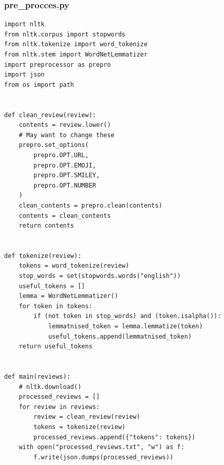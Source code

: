 \documentclass[11pt]{article} %
\begin{document}
\subsubsection{pre\_procces.py}
\begin{verbatim}
import nltk
from nltk.corpus import stopwords
from nltk.tokenize import word_tokenize
from nltk.stem import WordNetLemmatizer
import preprocessor as prepro
import json
from os import path


def clean_review(review):
    contents = review.lower()
    # May want to change these
    prepro.set_options(
        prepro.OPT.URL,
        prepro.OPT.EMOJI,
        prepro.OPT.SMILEY,
        prepro.OPT.NUMBER
    )
    clean_contents = prepro.clean(contents)
    contents = clean_contents
    return contents


def tokenize(review):
    tokens = word_tokenize(review)
    stop_words = set(stopwords.words("english"))
    useful_tokens = []
    lemma = WordNetLemmatizer()
    for token in tokens:
        if (not token in stop_words) and (token.isalpha()):
            lemmatnised_token = lemma.lemmatize(token)
            useful_tokens.append(lemmatnised_token)
    return useful_tokens


def main(reviews):
    # nltk.download()
    processed_reviews = []
    for review in reviews:
        review = clean_review(review)
        tokens = tokenize(review)
        processed_reviews.append({"tokens": tokens})
    with open("processed_reviews.txt", "w") as f:
        f.write(json.dumps(processed_reviews))
\end{verbatim}
\end{document}

